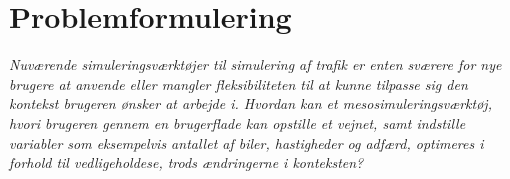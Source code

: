 \chapter{Problemformulering}\label{Problemformulering}
\begin{center}
\textit{Nuværende simuleringsværktøjer til simulering af trafik er enten sværere for nye brugere at anvende eller mangler fleksibiliteten til at kunne tilpasse sig den kontekst brugeren ønsker at arbejde i. Hvordan kan et mesosimuleringsværktøj, hvori brugeren gennem en brugerflade kan opstille et vejnet, samt indstille variabler som eksempelvis antallet af biler, hastigheder og adfærd, optimeres i forhold til vedligeholdese, trods ændringerne i konteksten?}
\end{center}


